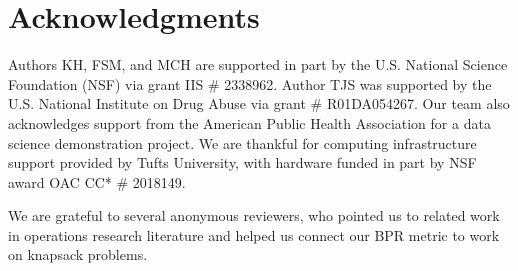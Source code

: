 
\section*{Acknowledgments}
Authors KH, FSM, and MCH are supported in part by the U.S. National Science Foundation (NSF) via grant IIS \# 2338962. 
Author TJS was supported by the U.S. National Institute on Drug Abuse via grant \# R01DA054267.
Our team also acknowledges support from the American Public Health Association for a data science demonstration project.
We are thankful for computing infrastructure support provided by Tufts University, with hardware funded in part by NSF award OAC CC* \# 2018149.

We are grateful to several anonymous reviewers, who pointed us to related work in operations research literature and helped us connect our BPR metric to work on knapsack problems.